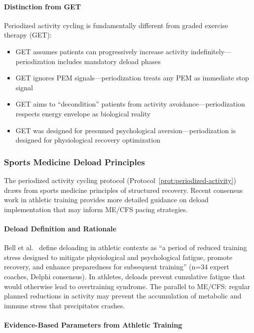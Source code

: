 \begin{protocol}
\paragraph{Distinction from GET}
Periodized activity cycling is fundamentally different from graded exercise therapy (GET):
\begin{itemize}
    \item GET assumes patients can progressively increase activity indefinitely---periodization includes mandatory deload phases
    \item GET ignores PEM signals---periodization treats any PEM as immediate stop signal
    \item GET aims to ``decondition'' patients from activity avoidance---periodization respects energy envelope as biological reality
    \item GET was designed for presumed psychological aversion---periodization is designed for physiological recovery optimization
\end{itemize}
\end{protocol}

\subsubsection{Sports Medicine Deload Principles}
\label{sec:sports-deload}

The periodized activity cycling protocol (Protocol~\ref{prot:periodized-activity}) draws from sports medicine principles of structured recovery. Recent consensus work in athletic training provides more detailed guidance on deload implementation that may inform ME/CFS pacing strategies.

\paragraph{Deload Definition and Rationale}

Bell et al.~\cite{Bell2023deload} define deloading in athletic contexts as ``a period of reduced training stress designed to mitigate physiological and psychological fatigue, promote recovery, and enhance preparedness for subsequent training'' (n=34 expert coaches, Delphi consensus). In athletes, deloads prevent cumulative fatigue that would otherwise lead to overtraining syndrome. The parallel to ME/CFS: regular planned reductions in activity may prevent the accumulation of metabolic and immune stress that precipitates crashes.

\paragraph{Evidence-Based Parameters from Athletic Training}

